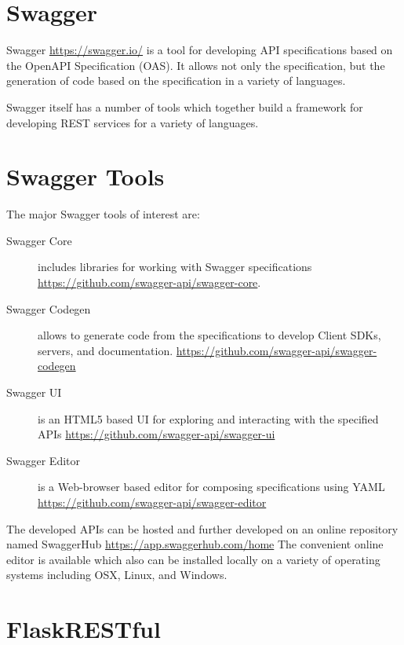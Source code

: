 \section{Swagger}

Swagger \url{https://swagger.io/} is a tool for developing API
specifications based on the OpenAPI Specification (OAS). It allows not
only the specification, but the generation of code based on the
specification in a variety of languages.

Swagger itself has a number of tools which together build a framework
for developing REST services for a variety of languages.


\section{Swagger Tools}

The major Swagger tools of interest are:

\begin{description}

\item[Swagger Core] includes libraries for working with Swagger
 specifications \url{https://github.com/swagger-api/swagger-core}.

\item[Swagger Codegen] allows to generate code from the specifications
 to develop Client SDKs, servers, and documentation. \url{https://github.com/swagger-api/swagger-codegen}

\item[Swagger UI] is an HTML5 based UI for exploring and interacting
 with the specified APIs \url{https://github.com/swagger-api/swagger-ui}

\item[Swagger Editor] is a Web-browser based editor for composing 
 specifications using YAML \url{https://github.com/swagger-api/swagger-editor}

\end{description}

The developed APIs can be hosted and further developed on an
online repository named SwaggerHub \url{https://app.swaggerhub.com/home}
The convenient online editor is available which also can be installed
locally on a variety of operating systems including OSX, Linux, and
Windows. 


\section{FlaskRESTful}

